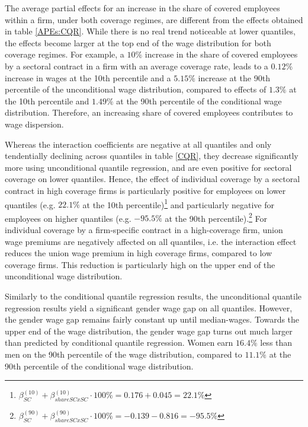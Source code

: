 The average partial effects for an increase in the share of covered employees within a firm, under both coverage regimes, are different from the effects obtained in table \ref{APEs:CQR}. While there is no real trend noticeable at lower quantiles, the effects become larger at the top end of the wage distribution for both coverage regimes. For example, a $10\%$ increase in the share of covered employees by a sectoral contract in a firm with an average coverage rate, leads to a $0.12\%$ increase in wages at the 10th percentile and a $5.15\%$ increase at the 90th percentile of the unconditional wage distribution, compared to effects of $1.3\%$ at the 10th percentile and $1.49\%$ at the 90th percentile of the conditional wage distribution. Therefore, an increasing share of covered employees contributes to wage dispersion.

Whereas the interaction coefficients are negative at all quantiles and only tendentially declining across quantiles in table \ref{CQR}, they decrease significantly more using unconditional quantile regression, and are even positive for sectoral coverage on lower quantiles. Hence, the effect of individual coverage by a sectoral contract in high coverage firms is particularly positive for employees on lower quantiles (e.g. $22.1\%$ at the 10th percentile)\footnote{ $\beta_{SC}^{(10)}+\beta_{shareSCxSC}^{(10)} \cdot 100\%=0.176+0.045=22.1\%$} and particularly negative for employees on higher quantiles (e.g. $-95.5\%$ at the 90th percentile).\footnote{ $\beta_{SC}^{(90)}+\beta_{shareSCxSC}^{(90)} \cdot 100\%=-0.139-0.816=-95.5\%$} For individual coverage by a firm-specific contract in a high-coverage firm, union wage premiums are negatively affected on all quantiles, i.e. the interaction effect reduces the union wage premium in high coverage firms, compared to low coverage firms. This reduction is particularly high on the upper end of the unconditional wage distribution.

Similarly to the conditional quantile regression results, the unconditional quantile regression results yield a significant gender wage gap on all quantiles. However, the gender wage gap remains fairly constant up until median-wages. Towards the upper end of the wage distribution, the gender wage gap turns out much larger than predicted by conditional quantile regression. Women earn $16.4\%$ less than men on the 90th percentile of the wage distribution, compared to $11.1\%$ at the 90th percentile of the conditional wage distribution.

